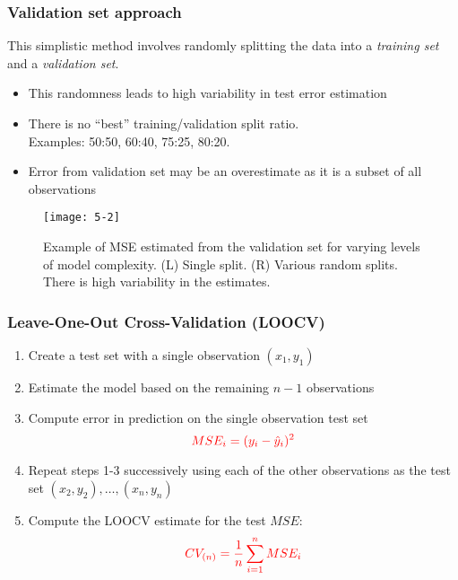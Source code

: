 \documentclass[smaller]{beamer}
\newcommand{\?}{\stackrel{?}{=}}
\newcommand{\fr}{\frac}
\newcommand{\rd}{\color{red}}
\begin{document}
\begin{frame}
  \frametitle{Validation set approach}
  \pause
  This simplistic method involves randomly splitting the data into a \textit{training set} and a \textit{validation set}.\pause

  \begin{itemize}[<+->]
  \item This randomness leads to high variability in test error estimation
  \item There is no ``best'' training/validation split ratio. \\ \pause
    \quad Examples: 50:50, 60:40, 75:25, 80:20.
  \item Error from validation set may be an overestimate as it is a subset of all observations
  \end{itemize}
  \pause

  \begin{figure}[h!]
    \centering
    \texttt{[image: 5-2]}
    \caption{Example of MSE estimated from the validation set for varying levels of model complexity. (L) Single split. (R) Various random splits.
    There is high variability in the estimates.}
    \label{fig:valset}
  \end{figure}
\end{frame}


\begin{frame}
  \frametitle{Leave-One-Out Cross-Validation (LOOCV)}
  \begin{enumerate}[<+->]
  \item Create a test set with a single observation $(x_1,y_1)$
  \item Estimate the model based on the remaining $n-1$ observations
  \item Compute error in prediction on the single observation test set
    \begin{equation}
      \label{eq:12}\rd
      MSE_i = (y_i - \hat y_i)^2
    \end{equation}    
  \item Repeat steps 1-3 successively using each of the other observations as the test set $(x_2,y_2), \ldots, (x_n,y_n)$
  \item Compute the LOOCV estimate for the test $MSE$:
    \begin{equation}
      \label{eq:11}\rd
      CV_{(n)} = \fr1n\sum_{i=1}^n MSE_i
    \end{equation}
  \end{enumerate}
\end{frame}
\end{document}
